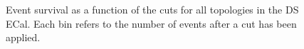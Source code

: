 \begin{figure}
\begin{minipage}{.5\linewidth}
\end{minipage}%
\begin{minipage}{.5\linewidth}
\centering
{}
\end{minipage}\par\medskip
\caption{Event survival as a function of the cuts for all topologies in the DS ECal.  Each bin refers to the number of events after a cut has been applied.}
\label{fig:SelEventSurvivalDS}
\end{figure}
\newline
\newline
